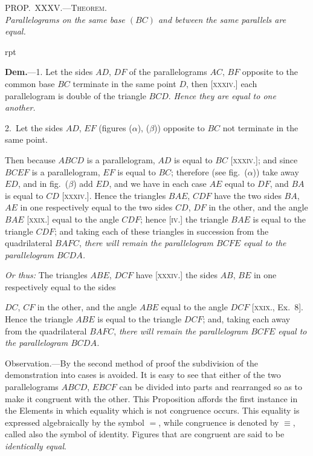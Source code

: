 \documentclass[oneside]{book}
\newcounter{wrapwidth}
\newcommand\myprop[2]{
\bigskip\Needspace*{4\baselineskip}\begin{center}\textsc{#1}\\\medskip\emph{#2}\par\end{center}
}
\newcommand\imgflow[3]{
\setcounter{wrapwidth}{#1}

\begin{wrapfigure}[#2]{r}{\value{wrapwidth}pt}
\begin{center}
\vspace{-0.3in}

\end{center}
\end{wrapfigure}
}
\newcommand\imgcent[2]{
\begin{center}

\end{center}
}
\begin{document}
\myprop{PROP\@.~XXXV\@.---Theorem.}{Parallelograms on the same base $(BC)$ and between the
same parallels are equal.}


\imgflow{175}{8}{f055}

\textbf{Dem.}---1. Let the sides $AD$, $DF$ of the parallelograms
$AC$, $BF$ opposite to the
common base $BC$ terminate
in the same
point $D$, then [\textsc{xxxiv}.]
each parallelogram is
double of the triangle
$BCD$. \emph{Hence they are
equal to one another.}

2.~Let the sides $AD$, $EF$ (figures ($\alpha$), ($\beta$)) opposite
to $BC$ not terminate in the same point.


\imgcent{338}{f056}

Then because $ABCD$ is a parallelogram, $AD$ is equal
to $BC$ [\textsc{xxxiv}.]; and since $BCEF$ is a parallelogram, $EF$
is equal to $BC$; therefore (see fig.~($\alpha$)) take away $ED$,
and in fig.~($\beta$) add $ED$, and we have in each case $AE$
equal to $DF$, and $BA$ is equal to $CD$ [\textsc{xxxiv}.]. Hence
the triangles $BAE$, $CDF$ have the two sides $BA$, $AE$ in
one respectively equal to the two sides $CD$, $DF$ in the
other, and the angle $BAE$ [\textsc{xxix}.] equal to the angle
$CDF$; hence [\textsc{iv}.] the triangle $BAE$ is equal to the triangle
$CDF$; and taking each of these triangles in succession
from the quadrilateral $BAFC$, \emph{there will remain
the parallelogram $BCFE$ equal to the parallelogram $BCDA$.}

\emph{Or thus:} The triangles $ABE$, $DCF$ have [\textsc{xxxiv}.]
the sides $AB$, $BE$ in one respectively equal to the sides

$DC$, $CF$ in the other, and the angle $ABE$ equal to the
angle $DCF$ [\textsc{xxix}., Ex.~8]. Hence the triangle $ABE$ is
equal to the triangle $DCF$; and, taking each away from
the quadrilateral $BAFC$, \emph{there will remain the parallelogram
$BCFE$ equal to the parallelogram $BCDA$.}\par\medskip

\begin{footnotesize}
\textsf{Observation}.---By the second method of proof the subdivision
of the demonstration into cases is avoided. It is easy to see that
either of the two parallelograms $ABCD$, $EBCF$ can be divided
into parts and rearranged so as to make it congruent with the
other. This Proposition affords the first instance in the Elements
in which equality which is not congruence occurs. This equality
is expressed algebraically by the symbol $=$, while congruence
is denoted by $\equiv$, called also the symbol of identity. Figures that
are congruent are said to be \emph{identically equal}.
\par\end{footnotesize}
\end{document}
